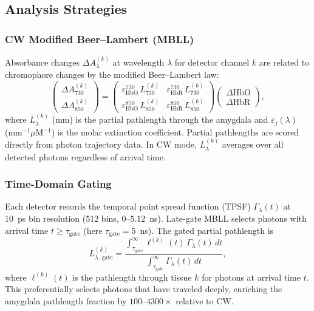 \documentclass[11pt,a4paper]{article}
\begin{document}
\subsection{Analysis Strategies}

\subsubsection*{CW Modified Beer--Lambert (MBLL)}

Absorbance changes $\Delta A_\lambda^{(k)}$ at wavelength $\lambda$ for detector channel $k$ are related to chromophore changes by the modified Beer--Lambert law:
\begin{equation}
    \begin{pmatrix} \Delta A_{730}^{(k)} \\ \Delta A_{850}^{(k)} \end{pmatrix}
    =
    \begin{pmatrix}
    \varepsilon_\mathrm{HbO}^{730}\,L_{730}^{(k)} & \varepsilon_\mathrm{HbR}^{730}\,L_{730}^{(k)} \\[4pt]
    \varepsilon_\mathrm{HbO}^{850}\,L_{850}^{(k)} & \varepsilon_\mathrm{HbR}^{850}\,L_{850}^{(k)}
    \end{pmatrix}
    \begin{pmatrix} \Delta\mathrm{HbO} \\ \Delta\mathrm{HbR} \end{pmatrix},
    \label{eq:mbll}
\end{equation}
where $L_\lambda^{(k)}$ (mm) is the partial pathlength through the amygdala and $\varepsilon_j(\lambda)$ (mm$^{-1}\mu$M$^{-1}$) is the molar extinction coefficient. Partial pathlengths are scored directly from photon trajectory data. In CW mode, $L_\lambda^{(k)}$ averages over all detected photons regardless of arrival time.

\subsubsection*{Time-Domain Gating}

Each detector records the temporal point spread function (TPSF) $\Gamma_\lambda(t)$ at 10~ps bin resolution (512 bins, $0$--$5.12$~ns). Late-gate MBLL selects photons with arrival time $t \geq \tau_\mathrm{gate}$ (here $\tau_\mathrm{gate} = 5$~ns). The gated partial pathlength is
\begin{equation}
    L_{\lambda,\,\mathrm{gate}}^{(k)} =
    \frac{\displaystyle\int_{\tau_\mathrm{gate}}^{\infty} \ell^{(k)}(t)\,\Gamma_\lambda(t)\,dt}
         {\displaystyle\int_{\tau_\mathrm{gate}}^{\infty} \Gamma_\lambda(t)\,dt},
    \label{eq:td_pl}
\end{equation}
where $\ell^{(k)}(t)$ is the pathlength through tissue $k$ for photons at arrival time $t$. This preferentially selects photons that have traveled deeply, enriching the amygdala pathlength fraction by $100$--$4300\times$ relative to CW.
\end{document}
